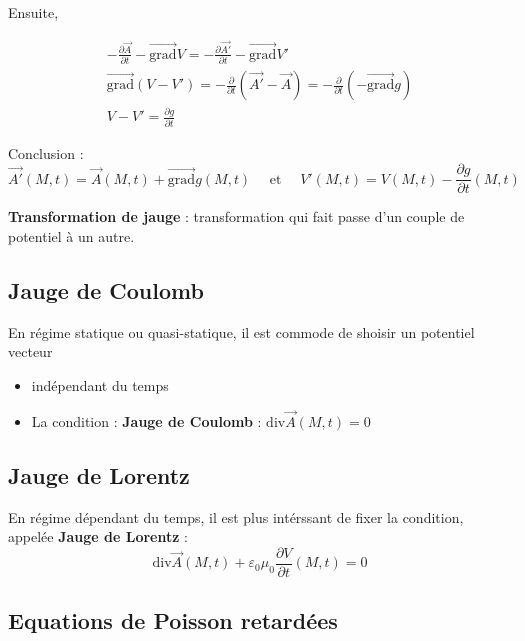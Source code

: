 Ensuite, 

\begin{gather}
    - \frac{\partial \overrightarrow{A}}{\partial t}  - \overrightarrow{\mathrm{grad}}V = - \frac{\partial \overrightarrow{A'}}{\partial t}  - \overrightarrow{\mathrm{grad}}V' \\ 
    \overrightarrow{\mathrm{grad}} ( V - V') = - \frac{\partial }{\partial t} (\overrightarrow{A'} - \overrightarrow{A}) = - \frac{\partial }{\partial t} (- \overrightarrow{\mathrm{grad}} g ) \\ 
    \boxed{V - V' = \frac{\partial g}{\partial t} }
\end{gather}

Conclusion : 
\begin{equation}
  \overrightarrow{A'}(M,t) = \overrightarrow{A}(M,t) +  \overrightarrow{\mathrm{grad}} g (M,t) \quad \text{ et } \quad V'(M,t) = V (M, t) - \frac{\partial g}{\partial t} (M,t)
\end{equation}

\textbf{Transformation de jauge} : transformation qui fait passe d'un couple de potentiel à un autre.
\subsection{Jauge de Coulomb} %
\label{sec:Jauge de Coulomb}
En régime statique ou quasi-statique, il est commode de shoisir un potentiel vecteur 
\begin{itemize}

    \item indépendant du temps 
    \item La condition : \textbf{Jauge de Coulomb} : $\boxed{\mathrm{div}\overrightarrow{A}(M,t)= 0}$

\end{itemize}

\subsection{Jauge de Lorentz} %
\label{sec:Jauge de Lorentz}
En régime dépendant du temps, il est plus intérssant de fixer la condition, appelée \textbf{Jauge de Lorentz} : 
\begin{equation}
  \mathrm{div} \overrightarrow{A}(M,t) + \varepsilon_0 \mu_0 \frac{\partial V}{\partial t} (M,t) = 0
\end{equation}

\subsection{Equations de Poisson retardées} %
\label{sec:Equations de Poisson retardées}

